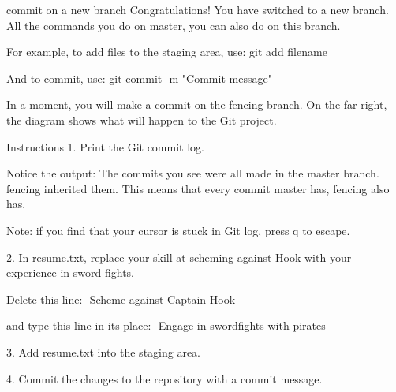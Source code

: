 commit on a new branch
    Congratulations! You have switched to a new branch. All the commands you do on master, you can also do on this branch.

    For example, to add files to the staging area, use:
        git add filename
    
    And to commit, use:
        git commit -m "Commit message"
    
    In a moment, you will make a commit on the fencing branch. On the far right, the diagram shows what will happen to the Git project.

Instructions
    1.
    Print the Git commit log.

    Notice the output:
        The commits you see were all made in the master branch. fencing inherited them.
        This means that every commit master has, fencing also has.

    Note: if you find that your cursor is stuck in Git log, press q to escape.

    2.
    In resume.txt, replace your skill at scheming against Hook with your experience in sword-fights.

    Delete this line:
        -Scheme against Captain Hook
    
    and type this line in its place:
        -Engage in swordfights with pirates
    
    3.
    Add resume.txt into the staging area.

    4.
    Commit the changes to the repository with a commit message.